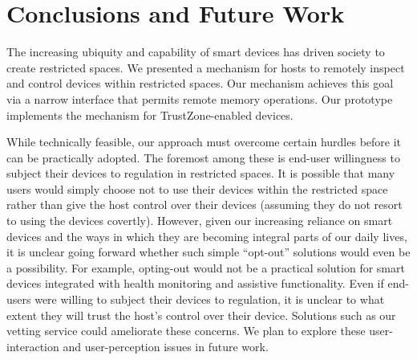 \section{Conclusions and Future Work}
\label{section:conclusions}

The increasing ubiquity and capability of smart devices has driven society to
create restricted spaces. We presented a mechanism for hosts to remotely
inspect and control devices within restricted spaces. Our mechanism achieves
this goal via a narrow interface that permits remote memory operations. Our
prototype implements the mechanism for TrustZone-enabled devices.

While technically feasible, our approach must overcome certain hurdles before
it can be practically adopted. The foremost among these is end-user willingness
to subject their devices to regulation in restricted spaces. It is possible
that many users would simply choose not to use their devices within the
restricted space rather than give the host control over their devices (assuming
they do not resort to using the devices covertly). However, given our
increasing reliance on smart devices and the ways in which they are becoming
integral parts of our daily lives, it is unclear going forward whether such
simple ``opt-out'' solutions would even be a possibility. For example,
opting-out would not be a practical solution for smart devices integrated with
health monitoring and assistive functionality. Even if end-users were willing
to subject their devices to regulation, it is unclear to what extent they will
trust the host's control over their device. Solutions such as our vetting
service could ameliorate these concerns. We plan to explore these
user-interaction and user-perception issues in future work.

% 
%
%
